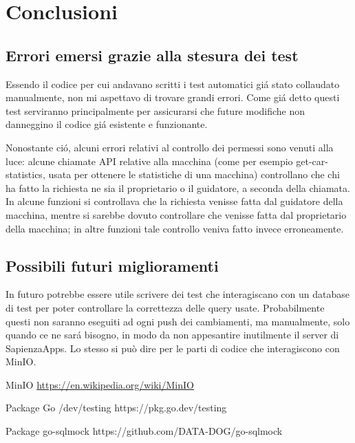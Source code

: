 \documentclass[italian, oneside]{sapthesis} %
\begin{document}
\chapter{Conclusioni}
\section{Errori emersi grazie alla stesura dei test}
		Essendo il codice per cui andavano scritti i test automatici gi\'a stato collaudato manualmente, non mi aspettavo di trovare grandi errori. Come gi\'a detto questi test serviranno principalmente per assicurarsi che future modifiche non danneggino il codice gi\'a esistente e funzionante.

		Nonostante ci\'o, alcuni errori relativi al controllo dei permessi sono venuti alla luce: alcune chiamate API relative alla macchina (come per esempio get-car-statistics, usata per ottenere le statistiche di una macchina) controllano che chi ha fatto la richiesta ne sia il proprietario o il guidatore, a seconda della chiamata. In alcune funzioni si controllava che la richiesta venisse fatta dal guidatore della macchina, mentre si sarebbe dovuto controllare che venisse fatta dal proprietario della macchina; in altre funzioni tale controllo veniva fatto invece erroneamente.

	\section{Possibili futuri miglioramenti}
		In futuro potrebbe essere utile scrivere dei test che interagiscano con un database di test per poter controllare la correttezza delle query usate. Probabilmente questi non saranno eseguiti ad ogni push dei cambiamenti, ma manualmente, solo quando ce ne sar\'a bisogno, in modo da non appesantire inutilmente il server di SapienzaApps. Lo stesso si pu\`o dire per le parti di codice che interagiscono con MinIO.

\backmatter

\begin{thebibliography}{9}

MinIO \url{https://en.wikipedia.org/wiki/MinIO}

Package Go /dev/testing https://pkg.go.dev/testing

Package go-sqlmock https://github.com/DATA-DOG/go-sqlmock

\end{thebibliography}
\end{document}
